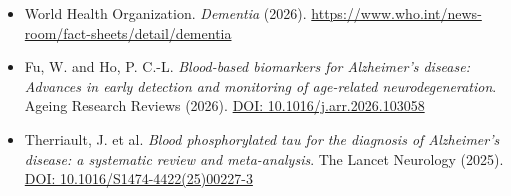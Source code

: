 \documentclass[11pt,a4paper]{article}
\begin{document}
\begin{itemize}
    \item World Health Organization.
    \textit{Dementia} (2026).
    \url{https://www.who.int/news-room/fact-sheets/detail/dementia}

    \item Fu, W. and Ho, P. C.-L.
    \textit{Blood-based biomarkers for Alzheimer's
    disease: Advances in early detection and
    monitoring of age-related neurodegeneration}.
    Ageing Research Reviews (2026).
    \href{https://doi.org/10.1016/j.arr.2026.103058}
    {DOI: 10.1016/j.arr.2026.103058}

    \item Therriault, J. et al.
    \textit{Blood phosphorylated tau for
    the diagnosis of Alzheimer's disease:
    a systematic review and meta-analysis}.
    The Lancet Neurology (2025).
    \href{https://doi.org/10.1016/S1474-4422(25)00227-3}
    {DOI: 10.1016/S1474-4422(25)00227-3}
\end{itemize}
\end{document}
